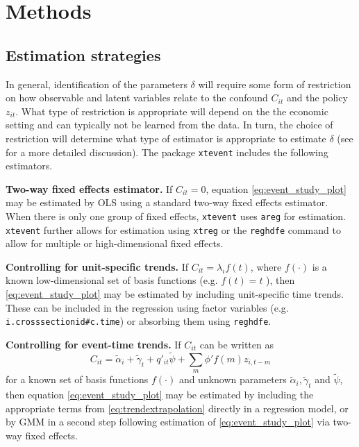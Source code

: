 \documentclass[bib]{./sty/statapress}
\begin{document}

\section{Methods}\label{sec:methods}

\subsection{Estimation strategies}

In general, identification of the parameters $\delta$ will require some form of restriction on how observable and latent variables relate to the confound $C_{it}$ and the policy $z_{it}$.
What type of restriction is appropriate will depend on the the economic setting and can typically not be learned from the data.
In turn, the choice of restriction will determine what type of estimator is appropriate to estimate $\delta$ (see \citeauthor{freyaldenhoven2021visualization} \citeyear{freyaldenhoven2021visualization} for a more detailed discussion).
The package \texttt{xtevent} includes the following estimators.

\noindent \textbf{Two-way fixed effects estimator.}
If $C_{it} = 0$, equation \eqref{eq:event_study_plot} may be estimated by OLS using a standard two-way fixed effects estimator.
When there is only one group of fixed effects, \texttt{xtevent} uses \texttt{areg} for estimation.
\texttt{xtevent} further allows for estimation using \texttt{xtreg} or the \texttt{reghdfe} command \citep{guimaraes2010simple,Correia2017:HDFE,correia2019reghdfe} to allow for multiple or high-dimensional fixed effects.

\noindent \textbf{Controlling for unit-specific trends.}
If $C_{it} = \lambda_i f(t)$, where $f(\cdot)$ is a known low-dimensional set of basis functions (e.g. $f(t) = t$ ), then \eqref{eq:event_study_plot} may be estimated by including unit-specific time trends.
These can be included in the regression using factor variables (e.g. \texttt{i.crosssectionid\#c.time}) or absorbing them using \texttt{reghdfe}.

\noindent \textbf{Controlling for event-time trends.}
If $C_{it}$ can be written as
\begin{equation}\label{eq:trendextrapolation}
  C_{it} = \tilde{\alpha}_i + \tilde{\gamma}_t + q'_{it} \tilde{\psi} + \sum_{m} \phi' f(m) z_{i,t-m}
\end{equation}
for a known set of basis functions $f(\cdot)$ and unknown parameters $\tilde{\alpha}_i, \tilde{\gamma}_t$ and $\tilde{\psi}$, then equation \eqref{eq:event_study_plot} may be estimated by including the appropriate terms from \eqref{eq:trendextrapolation} directly in a regression model, or by GMM in a second step following estimation of \eqref{eq:event_study_plot}  via two-way fixed effects.
\end{document}
